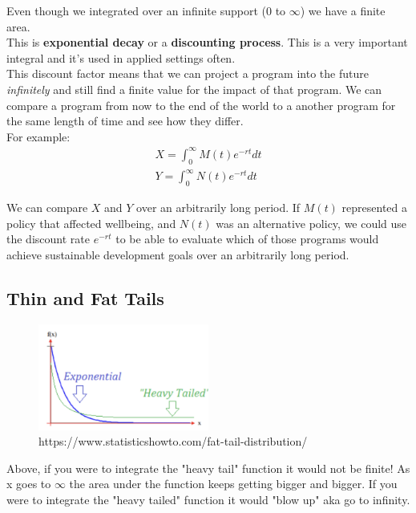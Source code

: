 \documentclass{article}
\begin{document}
Even though we integrated over an infinite support (0 to $\infty$) we have a finite area. \\

This is \textbf{exponential decay} or a \textbf{discounting process}. This is a very important integral and it's used in applied settings often. \\

This discount factor means that we can project a program into the future \textit{infinitely} and still find a finite value for the impact of that program. We can compare a program from now to the end of the world to a another program for the same length of time and see how they differ. \\

For example:
\begin{align}
    X = \int_0^\infty M(t) e^{-rt} dt\\
    Y = \int_0^\infty N(t) e^{-rt} dt
\end{align}

We can compare $X$ and $Y$ over an arbitrarily long period. If $M(t)$ represented a policy that affected wellbeing, and $N(t)$ was an alternative policy, we could use the discount rate $e^{-rt}$ to be able to evaluate which of those programs would achieve sustainable development goals over an arbitrarily long period.\\

\subsection{Thin and Fat Tails}


\begin{figure}[htp]
    \centering
        \includegraphics[width=0.5\textwidth]{Screen Shot 2023-10-04 at 10.56.06 AM.png}
    \caption{https://www.statisticshowto.com/fat-tail-distribution/}
\end{figure}

Above, if you were to integrate the "heavy tail" function it would not be finite! As x goes to $\infty$ the area under the function keeps getting bigger and bigger. If you were to integrate the "heavy tailed" function it would "blow up" aka go to infinity. \\
\end{document}
